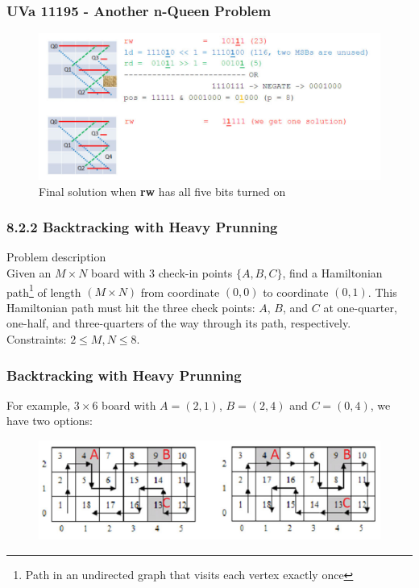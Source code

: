 \documentclass{beamer}
\begin{document}
\begin{frame}[fragile]
\frametitle{UVa 11195 - Another n-Queen Problem}

\begin{figure}
    \centering
    \includegraphics[scale=0.6]{imgs/nqueen_4.png}
    \caption{Final solution when \textbf{rw} has all five bits turned on}
\end{figure}

\end{frame}

\begin{frame}[fragile]
\frametitle{8.2.2 Backtracking with Heavy Prunning}

\color{red}Problem description\color{black} \\

Given an $M \times N$ board with $3$ check-in points $\{A, B, C\}$, find a Hamiltonian path\footnote{Path in an undirected graph that visits each vertex exactly once} of length $(M \times N)$ from coordinate $(0, 0)$ to coordinate $(0, 1)$. This Hamiltonian path must hit the three check points: $A$, $B$, and $C$ at one-quarter, one-half, and three-quarters of the way through its path, respectively. Constraints: $2 \leq M, N \leq 8$.

\end{frame}

\begin{frame}[fragile]
\frametitle{Backtracking with Heavy Prunning}

For example, $3 \times 6$ board with $A=(2,1)$, $B=(2,4)$ and $C=(0,4)$, we have two options: 

\begin{figure}
    \centering
    \includegraphics[scale=0.5]{imgs/robots_on_ice.png}
\end{figure}

\end{frame}
\end{document}
